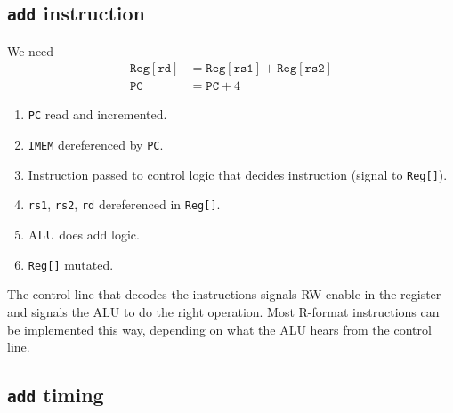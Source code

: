 \subsection{\texttt{add} instruction}
We need
\begin{align}
\texttt{Reg}\left[\texttt{rd}\right] &= \texttt{Reg}\left[\texttt{rs1}\right] + \texttt{Reg}\left[\texttt{rs2}\right] \\
\texttt{PC} &= \texttt{PC} + 4
\end{align}

\begin{enumerate}
	\item \texttt{PC} read and incremented.
	\item \texttt{IMEM} dereferenced by \texttt{PC}.
	\item Instruction passed to control logic that decides instruction (signal to \texttt{Reg[]}).
	\item \texttt{rs1}, \texttt{rs2}, \texttt{rd} dereferenced in \texttt{Reg[]}.
	\item ALU does add logic.
	\item \texttt{Reg[]} mutated.
\end{enumerate}
The control line that decodes the instructions signals RW-enable in the register and signals the ALU to do the right operation. Most R-format instructions can be implemented this way, depending on what the ALU hears from the control line.

\subsection{\texttt{add} timing}
\newcommand{\ditto}{\ensuremath{\downarrow}}
\noindent

